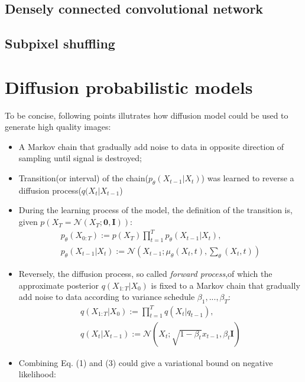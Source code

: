 \documentclass{article}
\begin{document}
\subsection{Densely connected convolutional network}
\subsection{Subpixel shuffling}
\section{Diffusion probabilistic models}
To be concise, following points illutrates how diffusion model could be used to generate high quality images:
\begin{itemize}
\item A Markov chain that gradually add noise to data in opposite direction of sampling until signal is destroyed;
\item Transition(or interval) of the chain($p_{\theta}(X_{t-1}|X_{t})$) was learned to reverse a diffusion process($q(X_{t}|X_{t-1}$)
\item During the learning process of the model, the definition of the transition is, given $p(X_{T} = \mathcal{N}(X_{T};\textbf{0},\textbf{I}))$: 
\begin{gather}
p_{\theta}(X_{0:T}) := p(X_{T})\prod_{t=1}^{T}p_{\theta}(X_{t-1}|X_{t}),\\
p_{\theta}(X_{t-1}|X_{t}) := \mathcal{N}(X_{t-1};\mu_{\theta}(X_{t},t),\sum_{\theta}(X_{t},t))
\end{gather}
\item Reversely, the diffusion process, so called \textit{forward process},of which the approximate posterior $q(X_{1:T}|X_{0})$ is fixed to a Markov chain that gradually add noise to data according to variance schedule $\beta_{1},...,\beta_{T}$:
\begin{gather}
    q(X_{1:T}|X_{0}) := \prod_{t=1}^{T}q(X_{t}|q_{t-1}),\\
    q(X_{t}|X_{t-1}) := \mathcal{N}(X_{t};\sqrt{1-\beta_{t}}x_{t-1},\beta_{t}\textbf{I})
\end{gather}
\item Combining Eq. (1) and (3) could give a variational bound on negative likelihood:
\begin{gather}
\end{gather}

\end{itemize}
\end{document}
